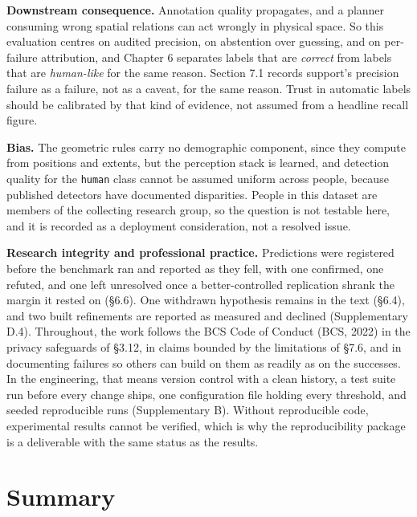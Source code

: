 \textbf{Downstream consequence.} Annotation quality propagates, and a planner consuming wrong spatial relations can act wrongly in physical space. So this evaluation centres on audited precision, on abstention over guessing, and on per-failure attribution, and Chapter 6 separates labels that are \textit{correct} from labels that are \textit{human-like} for the same reason. Section 7.1 records support's precision failure as a failure, not as a caveat, for the same reason. Trust in automatic labels should be calibrated by that kind of evidence, not assumed from a headline recall figure.

\textbf{Bias.} The geometric rules carry no demographic component, since they compute from positions and extents, but the perception stack is learned, and detection quality for the \texttt{human} class cannot be assumed uniform across people, because published detectors have documented disparities. People in this dataset are members of the collecting research group, so the question is not testable here, and it is recorded as a deployment consideration, not a resolved issue.

\textbf{Research integrity and professional practice.} Predictions were registered before the benchmark ran and reported as they fell, with one confirmed, one refuted, and one left unresolved once a better-controlled replication shrank the margin it rested on (\S{}6.6). One withdrawn hypothesis remains in the text (\S{}6.4), and two built refinements are reported as measured and declined (Supplementary D.4). Throughout, the work follows the BCS Code of Conduct (BCS, 2022) in the privacy safeguards of \S{}3.12, in claims bounded by the limitations of \S{}7.6, and in documenting failures so others can build on them as readily as on the successes. In the engineering, that means version control with a clean history, a test suite run before every change ships, one configuration file holding every threshold, and seeded reproducible runs (Supplementary B). Without reproducible code, experimental results cannot be verified, which is why the reproducibility package is a deliverable with the same status as the results.

\section{Summary}

